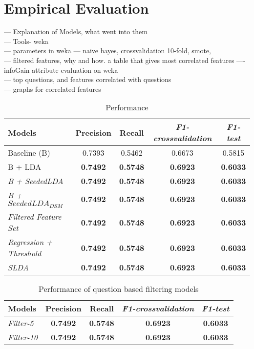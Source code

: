 
\section{Empirical Evaluation}
\label{sec:experiments}

--- Explanation of Models, what went into them\\
--- Tools- weka \\
--- parameters in weka --- naive bayes, crossvalidation 10-fold, smote, \\
--- filtered features, why and how. a table that gives most correlated features ---- infoGain attribute evaluation on weka\\
--- top questions, and features correlated with questions\\
--- graphs for correlated features




\begin{table} [ht]
\begin{tabular}{lcccc}
\toprule
Models & Precision & Recall & \textit{F1-crossvalidation} & \textit{F1-test}  \\
\midrule
Baseline (B) & 0.7393 & 0.5462 & 0.6673 & 0.5815 \\
B + LDA & \textbf{0.7492} & \textbf{0.5748} & \textbf{0.6923} & \textbf{0.6033} \\
\textit{B + SeededLDA} & \textbf{0.7492} & \textbf{0.5748} & \textbf{0.6923} & \textbf{0.6033} \\
\textit{B + $SeededLDA_{DSM}$} & \textbf{0.7492} & \textbf{0.5748} & \textbf{0.6923} & \textbf{0.6033} \\
\textit{Filtered Feature Set} & \textbf{0.7492} & \textbf{0.5748} & \textbf{0.6923} & \textbf{0.6033} \\
\textit{Regression + Threshold} & \textbf{0.7492} & \textbf{0.5748} & \textbf{0.6923} & \textbf{0.6033} \\
\textit{SLDA } & \textbf{0.7492} & \textbf{0.5748} & \textbf{0.6923} & \textbf{0.6033} \\
\bottomrule
\end{tabular}
\caption{Performance}
\label{table:results_1}
\end{table}


\begin{table} [ht]
\begin{tabular}{lcccc}
\toprule
Models & Precision & Recall & \textit{F1-crossvalidation} & \textit{F1-test}  \\
\midrule
\textit{Filter-5} & \textbf{0.7492} & \textbf{0.5748} & \textbf{0.6923} & \textbf{0.6033} \\
\textit{Filter-10} & \textbf{0.7492} & \textbf{0.5748} & \textbf{0.6923} & \textbf{0.6033} \\
\bottomrule
\end{tabular}
\caption{Performance of question based filtering models}
\label{table:results_2}
\end{table}

